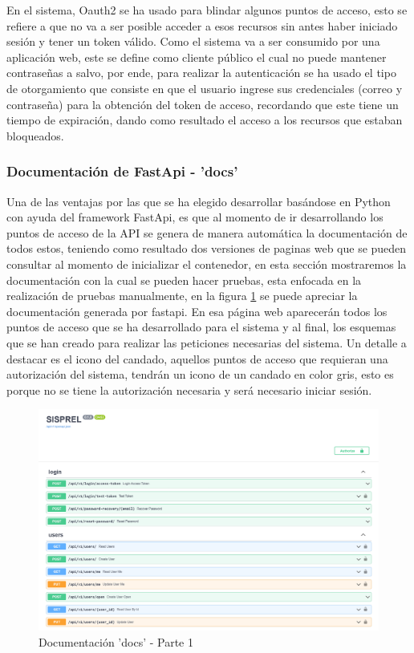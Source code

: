En el sistema, Oauth2 se ha usado para blindar algunos puntos de acceso, esto se refiere a que no va a ser posible acceder a esos recursos sin antes haber iniciado sesión y tener un token válido. Como el sistema va a ser consumido por una aplicación web, este se define como cliente público el cual no puede mantener contraseñas a salvo, por ende, para realizar la autenticación se ha usado el tipo de otorgamiento que consiste en que el usuario ingrese sus credenciales (correo y contraseña) para la obtención del token de acceso, recordando que este tiene un tiempo de expiración, dando como resultado el acceso a los recursos que estaban bloqueados.

\subsubsection{Documentación de FastApi - 'docs'}
Una de las ventajas por las que se ha elegido desarrollar basándose en Python con ayuda del framework FastApi, es que al momento de ir desarrollando los puntos de acceso de la API se genera de manera automática la documentación de todos estos, teniendo como resultado dos versiones de paginas web que se pueden consultar al momento de inicializar el contenedor, en esta sección mostraremos la documentación con la cual se pueden hacer pruebas, esta enfocada en la realización de pruebas manualmente, en la figura \ref{graphic:docs1} se puede apreciar la documentación generada por fastapi. En esa página web aparecerán todos los puntos de acceso que se ha desarrollado para el sistema y al final, los esquemas que se han creado para realizar las peticiones necesarias del sistema. Un detalle a destacar es el icono del candado, aquellos puntos de acceso que requieran una autorización del sistema, tendrán un icono de un candado en color gris, esto es porque no se tiene la autorización necesaria y será necesario iniciar sesión.

\begin{figure}[!htb]
    \centering
    \includegraphics[scale=.20]{TT/img/implementacion/docs_1.png}
    \caption{Documentación 'docs' - Parte 1}
    \label{graphic:docs1}    
\end{figure}

